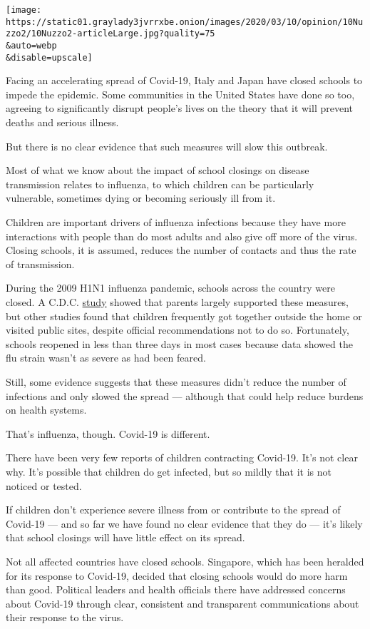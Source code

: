 \texttt{[image: https://static01.graylady3jvrrxbe.onion/images/2020/03/10/opinion/10Nuzzo2/10Nuzzo2-articleLarge.jpg?quality=75\\\&auto=webp\\\&disable=upscale]}

Facing an accelerating spread of Covid-19, Italy and Japan have closed
schools to impede the epidemic. Some communities in the United States
have done so too, agreeing to significantly disrupt people's lives on
the theory that it will prevent deaths and serious illness.

But there is no clear evidence that such measures will slow this
outbreak.

Most of what we know about the impact of school closings on disease
transmission relates to influenza, to which children can be particularly
vulnerable, sometimes dying or becoming seriously ill from it.

Children are important drivers of influenza infections because they have
more interactions with people than do most adults and also give off more
of the virus. Closing schools, it is assumed, reduces the number of
contacts and thus the rate of transmission.

During the 2009 H1N1 influenza pandemic, schools across the country were
closed. A C.D.C.
\href{https://www.cdc.gov/mmwr/preview/mmwrhtml/mm5935a2.htm?s_cid=mm5935a2_w}{study}
showed that parents largely supported these measures, but other studies
found that children frequently got together outside the home or visited
public sites, despite official recommendations not to do so.
Fortunately, schools reopened in less than three days in most cases
because data showed the flu strain wasn't as severe as had been feared.

Still, some evidence suggests that these measures didn't reduce the
number of infections and only slowed the spread --- although that could
help reduce burdens on health systems.

That's influenza, though. Covid-19 is different.

There have been very few reports of children contracting Covid-19. It's
not clear why. It's possible that children do get infected, but so
mildly that it is not noticed or tested.

If children don't experience severe illness from or contribute to the
spread of Covid-19 --- and so far we have found no clear evidence that
they do --- it's likely that school closings will have little effect on
its spread.

Not all affected countries have closed schools. Singapore, which has
been heralded for its response to Covid-19, decided that closing schools
would do more harm than good. Political leaders and health officials
there have addressed concerns about Covid-19 through clear, consistent
and transparent communications about their response to the virus.

